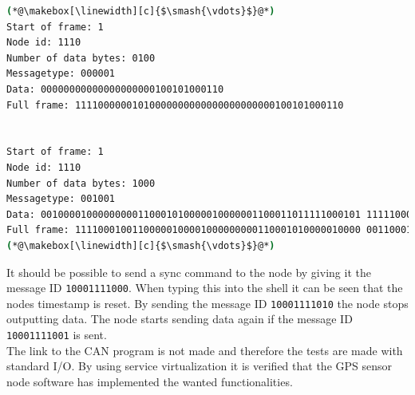 \begin{lstlisting}[language=bash]
(*@\makebox[\linewidth][c]{$\smash{\vdots}$}@*)
Start of frame: 1
Node id: 1110
Number of data bytes: 0100
Messagetype: 000001
Data: 00000000000000000000100101000110
Full frame: 11110000001010000000000000000000000100101000110


Start of frame: 1
Node id: 1110
Number of data bytes: 1000
Messagetype: 001001
Data: 00100001000000000110001010000010000001100011011111000101 11111000
Full frame: 11110001001100000100001000000000110001010000010000 00110001101111100010111111000
(*@\makebox[\linewidth][c]{$\smash{\vdots}$}@*)
\end{lstlisting}

It should be possible to send a sync command to the node by giving it the message ID \texttt{10001111000}.
When typing this into the shell it can be seen that the nodes timestamp is reset.
By sending the message ID \texttt{10001111010} the node stops outputting data.
The node starts sending data again if the message ID \texttt{10001111001} is sent.\\

The link to the CAN program is not made and therefore the tests are made with standard I/O.
By using service virtualization it is verified that the GPS sensor node software has implemented the wanted functionalities.
